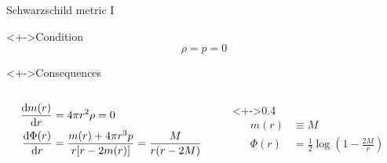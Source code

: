 \documentclass{beamer}
\let\svthefootnote\thefootnote
\newcommand\blankfootnote[1]{%
  \let\thefootnote\relax\footnotetext{#1}%
  \let\thefootnote\svthefootnote%
}
\begin{document}
\begin{frame}{Schwarzschild metric I}

\begin{block}<+->{Condition}
\begin{displaymath}
  \rho = p = 0
\end{displaymath}
\end{block}

\begin{block}<+->{Consequences}
\begin{columns}[c]

\begin{column}{0.6\textwidth}
\begin{align*}
  \dv{m(r)}{r} &=
  4 \pi r^2 \rho = 0
  \\
  \dv{\Phi(r)}{r} &=
  \frac{m(r) + 4 \pi r^3 p}{r [r - 2 m(r)]} = \frac{M}{r (r - 2 M)}
\end{align*}
\end{column}

\begin{column}<+->{0.4\textwidth}
\begin{align*}
  m(r) &\equiv M
  \\
  \Phi(r) &=
  \frac{1}{2} \log(1 - \frac{2 M}{r})
\end{align*}
\end{column}

\end{columns}
\end{block}

\blankfootnote{\textcite[pp. 262--263]{Schutz}}



\end{frame}

\end{document}
